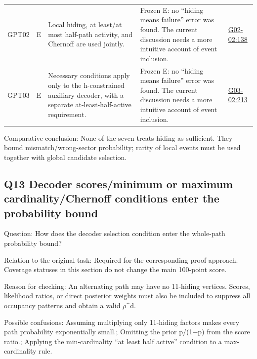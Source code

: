\documentclass[11pt,a4paper]{article}
\begin{document}
{\begin{longtable}
{}GPT02 & E & Local hiding,\allowbreak{} at least/\allowbreak{}at most half-path activity,\allowbreak{} and Chernoff are used jointly. & Frozen E: no “hiding means failure” error was found. The current discussion needs a more intuitive account of event inclusion. & \hyperref[src:G02-02]{G02-02:138}\tabularnewline
{}GPT03 & E & Necessary conditions apply only to the h-constrained auxiliary decoder,\allowbreak{} with a separate at-least-half-active requirement. & Frozen E: no “hiding means failure” error was found. The current discussion needs a more intuitive account of event inclusion. & \hyperref[src:G03-02]{G03-02:213}\tabularnewline
\bottomrule
\end{longtable}
}
Comparative conclusion: None of the seven treats hiding as sufficient. They bound mismatch/\allowbreak{}wrong-sector probability; rarity of local events must be used together with global candidate selection.

\clearpage
\subsection{Q13 Decoder scores/\allowbreak{}minimum or maximum cardinality/\allowbreak{}Chernoff conditions enter the probability bound}
\label{aspect:Q13}
Question: How does the decoder selection condition enter the whole-path probability bound?

Relation to the original task: Required for the corresponding proof approach. Coverage statuses in this section do not change the main 100-point score.

Reason for checking: An alternating path may have no 11-hiding vertices. Scores,\allowbreak{} likelihood ratios,\allowbreak{} or direct posterior weights must also be included to suppress all occupancy patterns and obtain a valid \ensuremath{\rho}\textasciicircum{}d.

Possible confusions: Assuming multiplying only 11-hiding factors makes every path probability exponentially small.; Omitting the prior p/\allowbreak{}(1\ensuremath{-}p) from the score ratio.; Applying the min-cardinality “at least half active” condition to a max-cardinality rule.
\end{document}
